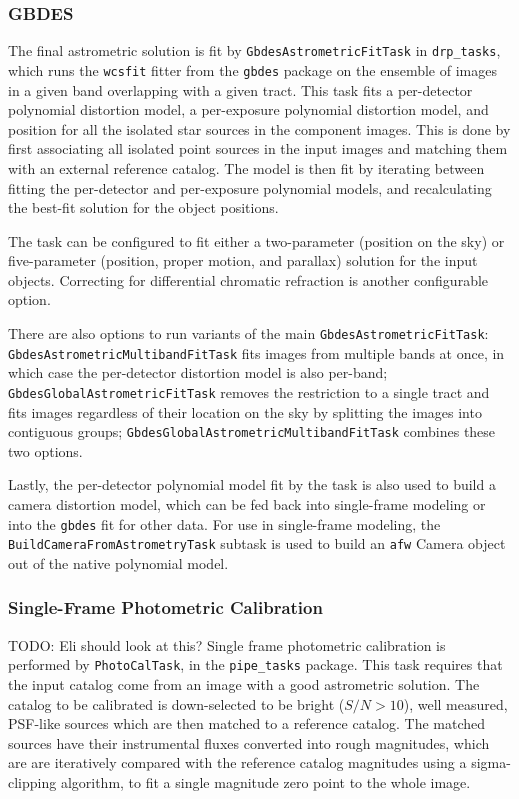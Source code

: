 \subsubsection{GBDES}
\label{sec:gbdes}

The final astrometric solution is fit by \texttt{GbdesAstrometricFitTask} in \texttt{drp\_tasks}, which runs the \texttt{wcsfit} fitter from the \texttt{gbdes} package \citep{2022ascl.soft10011B,2017PASP..129g4503B} on the ensemble of images in a given band overlapping with a given tract.
This task fits a per-detector polynomial distortion model, a per-exposure polynomial distortion model, and position for all the isolated star sources in the component images.
This is done by first associating all isolated point sources in the input images and matching them with an external reference catalog.
The model is then fit by iterating between fitting the per-detector and per-exposure polynomial models, and recalculating the best-fit solution for the object positions.

The task can be configured to fit either a two-parameter (position on the sky) or five-parameter (position, proper motion, and parallax) solution for the input objects.
Correcting for differential chromatic refraction is another configurable option.

There are also options to run variants of the main \texttt{GbdesAstrometricFitTask}: \texttt{GbdesAstrometricMultibandFitTask} fits images from multiple bands at once, in which case the per-detector distortion model is also per-band; \texttt{GbdesGlobalAstrometricFitTask} removes the restriction to a single tract and fits images regardless of their location on the sky by splitting the images into contiguous groups; \texttt{GbdesGlobalAstrometricMultibandFitTask} combines these two options.

Lastly, the per-detector polynomial model fit by the task is also used to build a camera distortion model, which can be fed back into single-frame modeling or into the \texttt{gbdes} fit for other data.
For use in single-frame modeling, the \texttt{BuildCameraFromAstrometryTask} subtask is used to build an \texttt{afw} Camera object out of the native polynomial model.

\subsubsection{Single-Frame Photometric Calibration}
\label{sec:photoCal}

TODO: Eli should look at this?
Single frame photometric calibration is performed by \texttt{PhotoCalTask}, in the \texttt{pipe\_tasks} package.
This task requires that the input catalog come from an image with a good astrometric solution.
The catalog to be calibrated is down-selected to be bright ($S/N>10$), well measured, PSF-like sources which are then matched to a reference catalog.
The matched sources have their instrumental fluxes converted into rough magnitudes, which are are iteratively compared with the reference catalog magnitudes using a sigma-clipping algorithm, to fit a single magnitude zero point to the whole image.

